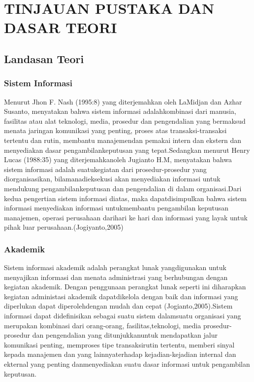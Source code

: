 \documentclass{jtetiproposalskripsi}
\begin{document}
\chapter{TINJAUAN PUSTAKA DAN DASAR TEORI}                

\section{Landasan Teori}
\subsection{Sistem Informasi}
Menurut Jhon F. Nash (1995:8) yang diterjemahkan oleh LaMidjan dan Azhar Susanto, menyatakan bahwa sistem informasi adalahkombinasi dari manusia, fasilitas atau alat teknologi, media, prosedur dan pengendalian yang bermaksud menata jaringan komunikasi yang penting, proses atas transaksi-transaksi tertentu dan rutin, membantu manajemendan pemakai intern dan ekstern dan menyediakan dasar pengambilankeputusan yang tepat.Sedangkan menurut Henry Lucas (1988:35) yang diterjemahkanoleh Jugianto H.M, menyatakan bahwa sistem informasi adalah suatukegiatan dari prosedur-prosedur yang diorganisasikan, bilamanadieksekusi akan menyediakan informasi untuk mendukung pengambilankeputusan dan pengendalian di dalam organisasi.Dari kedua pengertian sistem informasi diatas, maka dapatdisimpulkan bahwa sistem informasi menyediakan informasi untukmembantu pengambilan keputusan manajemen, operasi perusahaan darihari ke hari dan informasi yang layak untuk pihak luar perusahaan.(Jogiyanto,2005)


\subsection{Akademik}
Sistem informasi akademik adalah perangkat lunak yangdigunakan untuk menyajikan informasi dan menata administrasi yang berhubungan dengan kegiatan akademik. Dengan penggunaan perangkat lunak seperti ini diharapkan kegiatan administasi akademik dapatdikelola dengan baik dan informasi yang diperlukan dapat diperolehdengan mudah dan cepat (Jogianto,2005).Sistem informasi dapat didefinisikan sebagai suatu sistem dalamsuatu organisasi yang merupakan kombinasi dari orang-orang, fasilitas,teknologi, media prosedur-prosedur dan pengendalian yang ditunjukkanuntuk mendapatkan jalur komunikasi penting, memproses tipe transaksirutin tertentu, memberi sinyal kepada manajemen dan yang lainnyaterhadap kejadian-kejadian internal dan ekternal yang penting danmenyediakan suatu dasar informasi untuk pengambilan keputusan.
\end{document}
